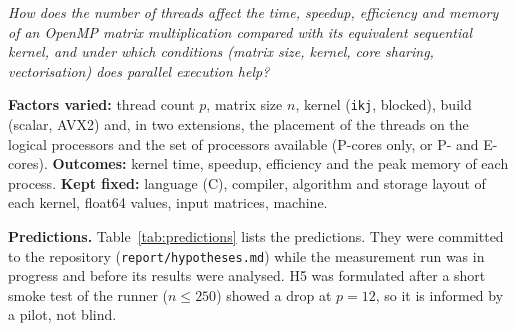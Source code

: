 \documentclass[11pt,a4paper]{article}
\begin{document}
\begin{center}
\begin{minipage}{0.92\textwidth}
\itshape How does the number of threads affect the time, speedup, efficiency and memory of
an OpenMP matrix multiplication compared with its equivalent sequential kernel, and under
which conditions (matrix size, kernel, core sharing, vectorisation) does parallel
execution help?
\end{minipage}
\end{center}

\textbf{Factors varied:} thread count $p$, matrix size $n$, kernel (\texttt{ikj}, blocked),
build (scalar, AVX2) and, in two extensions, the placement of the threads on the logical
processors and the set of processors available (P-cores only, or P- and E-cores).
\textbf{Outcomes:} kernel time, speedup, efficiency and the peak memory of each process.
\textbf{Kept fixed:} language (C), compiler, algorithm and storage layout of each kernel,
float64 values, input matrices, machine.

\textbf{Predictions.} Table~\ref{tab:predictions} lists the predictions. They were committed
to the repository (\texttt{report/hypotheses.md}) while the measurement run was in progress
and before its results were analysed. H5 was formulated after a short smoke test of the
runner ($n \le 250$) showed a drop at $p = 12$, so it is informed by a pilot, not blind.
\end{document}

